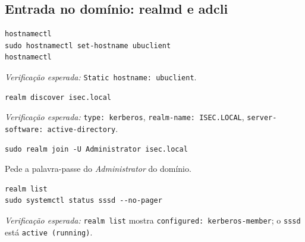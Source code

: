 
\subsection[Entrada no domínio: realmd e adcli]{Entrada no domínio: realmd e adcli}


\begin{lstlisting}[style=bashstyle]
hostnamectl
sudo hostnamectl set-hostname ubuclient
hostnamectl
\end{lstlisting}

\emph{Verificação esperada:} \texttt{Static hostname: ubuclient}.


\begin{lstlisting}[style=bashstyle]
realm discover isec.local
\end{lstlisting}

\emph{Verificação esperada:} \texttt{type: kerberos}, \texttt{realm-name: ISEC.LOCAL}, \texttt{server-software: active-directory}.


\begin{lstlisting}[style=bashstyle]
sudo realm join -U Administrator isec.local
\end{lstlisting}

Pede a palavra-passe do \emph{Administrator} do domínio.


\begin{lstlisting}[style=bashstyle]
realm list
sudo systemctl status sssd --no-pager
\end{lstlisting}

\emph{Verificação esperada:} \texttt{realm list} mostra \texttt{configured: kerberos-member}; o \texttt{sssd} está \texttt{active (running)}.

